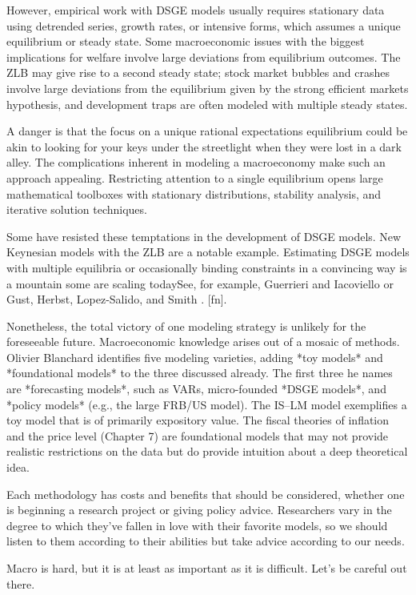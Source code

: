 ﻿\documentclass[oneside]{book}
\begin{document}
However, empirical work with DSGE models usually requires stationary data
using detrended series, growth rates, or intensive forms, which assumes a
unique equilibrium or steady state. Some macroeconomic issues with the
biggest implications for welfare involve large deviations from equilibrium
outcomes. The ZLB may give rise to a second steady state; stock market bubbles and crashes involve large deviations from the equilibrium given by the strong efficient markets hypothesis, and development traps are often modeled with multiple steady states.

A danger is that the focus on a unique rational expectations equilibrium could be akin to looking for your keys under the streetlight when they were lost in a dark alley. The complications inherent in modeling a macroeconomy make such an approach appealing. Restricting attention to a single equilibrium opens large mathematical toolboxes with stationary distributions, stability analysis, and iterative solution techniques.

Some have resisted these temptations in the development of DSGE models. New Keynesian models with the ZLB are a notable example. Estimating DSGE
models with multiple equilibria or occasionally binding constraints in a convincing way is a mountain some are scaling todaySee, for example, Guerrieri and Iacoviello  or Gust, Herbst, Lopez-Salido, and Smith . [fn].

Nonetheless, the total victory of one modeling strategy is unlikely for the
foreseeable future. Macroeconomic knowledge arises out of a mosaic of
methods. Olivier Blanchard  identifies five modeling varieties, adding *toy models* and *foundational models* to the three
discussed already. The first three he names are *forecasting models*, such as
VARs, micro-founded *DSGE models*, and *policy models* (e.g.,
the large FRB/US model). The IS--LM model exemplifies a toy model that
is of primarily expository value. The fiscal theories of inflation and the
price level (Chapter 7) are foundational models that may not provide realistic
restrictions on the data but do provide intuition about a deep theoretical idea.

Each methodology has costs and benefits that should be considered, whether one is
beginning a research project or giving policy advice. Researchers vary in
the degree to which they've fallen in love with their favorite models, so we
should listen to them according to their abilities but take advice according to our needs.

Macro is hard, but it is at least as important as it is difficult. Let's be careful out there.
\end{document}
